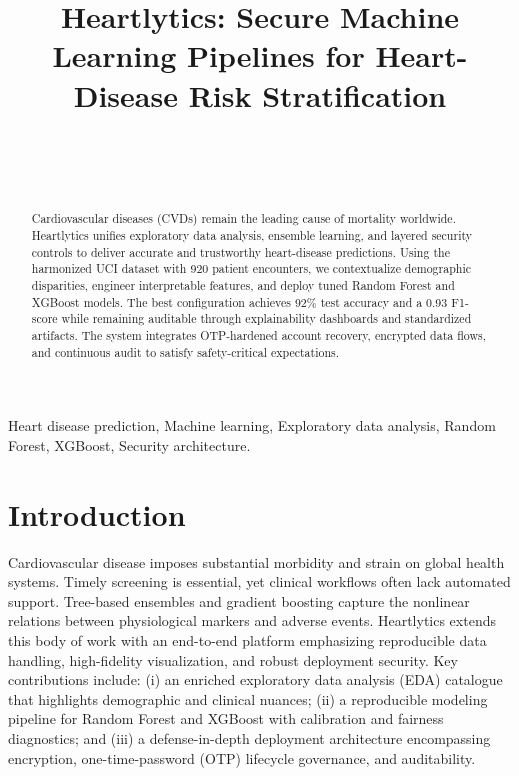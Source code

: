 \documentclass[conference]{IEEEtran}
\begin{document}
\title{Heartlytics: Secure Machine Learning Pipelines for Heart-Disease Risk Stratification}

\author{\\
\and
{}\\
}

\maketitle

\begin{abstract}
Cardiovascular diseases (CVDs) remain the leading cause of mortality worldwide. Heartlytics unifies exploratory data analysis, ensemble learning, and layered security controls to deliver accurate and trustworthy heart-disease predictions. Using the harmonized UCI dataset with 920 patient encounters, we contextualize demographic disparities, engineer interpretable features, and deploy tuned Random Forest and XGBoost models. The best configuration achieves 92\% test accuracy and a 0.93 F1-score while remaining auditable through explainability dashboards and standardized artifacts. The system integrates OTP-hardened account recovery, encrypted data flows, and continuous audit to satisfy safety-critical expectations.
\end{abstract}

\begin{IEEEkeywords}
Heart disease prediction, Machine learning, Exploratory data analysis, Random Forest, XGBoost, Security architecture.
\end{IEEEkeywords}

\section{Introduction}
Cardiovascular disease imposes substantial morbidity and strain on global health systems. Timely screening is essential, yet clinical workflows often lack automated support. Tree-based ensembles and gradient boosting capture the nonlinear relations between physiological markers and adverse events. Heartlytics extends this body of work with an end-to-end platform emphasizing reproducible data handling, high-fidelity visualization, and robust deployment security. Key contributions include: (i) an enriched exploratory data analysis (EDA) catalogue that highlights demographic and clinical nuances; (ii) a reproducible modeling pipeline for Random Forest and XGBoost with calibration and fairness diagnostics; and (iii) a defense-in-depth deployment architecture encompassing encryption, one-time-password (OTP) lifecycle governance, and auditability.
\end{document}
